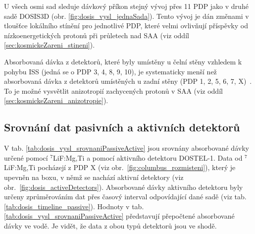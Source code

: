 U všech osmi sad sleduje dávkový příkon stejný vývoj přes 11 PDP jako v druhé sadě DOSIS3D (obr. \ref{fig:dosis_vysl_jednaSada}). Tento vývoj je  dán změnami v tloušťce lokálního stínění pro jednotlivé PDP, které velmi ovlivňují příspěvky od nízkoenergetických protonů při průletech nad SAA (viz oddíl \ref{sec:kosmickeZareni_stineni}). 

Absorbovaná dávka z detektorů, které byly umístěny u čelní stěny vzhledem k pohybu ISS (jedná se o PDP 3, 4, 8, 9, 10), je systematicky menší než absorbovaná dávka z detektorů umístěných u zadní stěny (PDP 1, 2, 5, 6, 7, X)~\cite{dosis}. To je možné vysvětlit anizotropií zachycených protonů v SAA (viz oddíl \ref{sec:kosmickeZareni_anizotropie}).
\subsection{Srovnání dat pasivních a aktivních detektorů}%
V tab. \ref{tab:dosis_vysl_srovnaniPassiveActive} jsou srovnány absorbované dávky určené pomocí $^7$LiF:Mg,Ti a pomocí aktivního detektoru DOSTEL-1. Data od $^7$LiF:Mg,Ti pocházejí z PDP X (viz obr.~\ref{fig:columbus_rozmisteni}), který je upevněn na boxu, v němž se nachází aktivní detektory (viz obr.~\ref{fig:dosis_activeDetectors}). Absorbované dávky aktivního detektoru byly určeny zprůměrováním dat přes časový interval odpovídající dané sadě (viz tab. \ref{tab:dosis_timeline_passive}). Hodnoty v tab. \ref{tab:dosis_vysl_srovnaniPassiveActive} představují přepočtené absorbované dávky ve vodě. Je vidět, že data z obou typů detektorů jsou ve shodě. 

